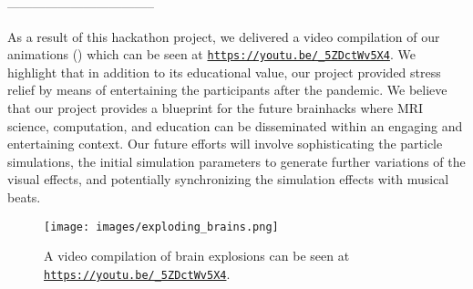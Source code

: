 \documentclass[../main.tex]{subfiles}
\begin{document}
-----------------------------------

As a result of this hackathon project, we delivered a video compilation of our animations () which can be seen at \texttt{\url{https://youtu.be/_5ZDctWv5X4}}. We highlight that in addition to its educational value, our project provided stress relief by means of entertaining the participants after the pandemic. We believe that our project provides a blueprint for the future brainhacks where MRI science, computation, and education can be disseminated within an engaging and entertaining context. Our future efforts will involve sophisticating the particle simulations, the initial simulation parameters to generate further variations of the visual effects, and potentially synchronizing the simulation effects with musical beats.

\begin{figure}
	\centering
	\texttt{[image: images/exploding\_brains.png]}
	\caption{A video compilation of brain explosions can be seen at \texttt{\url{https://youtu.be/_5ZDctWv5X4}}.}
	\label{fig:exploding_brains}
\end{figure}
\end{document}
